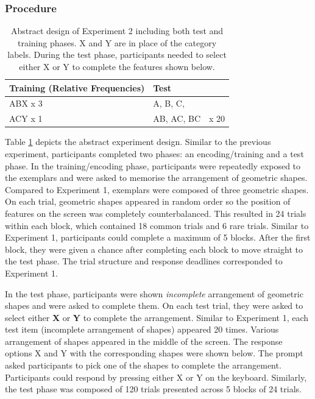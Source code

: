 \documentclass[10pt,letterpaper]{article}
\begin{document}
\subsubsection{Procedure}

\begin{table}[!ht]
  \begin{center}
    \caption{Abstract design of Experiment 2 including both test and training phases. X and Y are in place of the category labels. During the test phase, participants needed to select either X or Y to complete the features shown below.\\}
    \label{tab:abstract-exp2}
    \begin{tabular}{llr} %
      \textbf{Training (Relative Frequencies)} & \textbf{Test}& \\
      \hline
      ABX x 3 &  A, B, C,        & \\
      ACY x 1 &  AB, AC, BC      & x 20 \\
      \hline
    \end{tabular}
  \end{center}
\end{table}

Table \ref*{tab:abstract-exp2} depicts the abstract experiment design.
Similar to the previous experiment, participants completed two phases: an encoding/training and a test phase.
In the training/encoding phase, participants were repeatedly exposed to the exemplars and were asked to memorise the arrangement of geometric shapes.
Compared to Experiment 1, exemplars were composed of three geometric shapes.
On each trial, geometric shapes appeared in random order so the position of features on the screen was completely counterbalanced.
This resulted in 24 trials within each block, which contained 18 common trials and 6 rare trials.
Similar to Experiment 1, participants could complete a maximum of 5 blocks.
After the first block, they were given a chance after completing each block to move straight to the test phase.
The trial structure and response deadlines corresponded to Experiment 1.

In the test phase, participants were shown \textit{incomplete} arrangement of geometric shapes and were asked to complete them.
On each test trial, they were asked to select either \textbf{X} or \textbf{Y} to complete the arrangement.
Similar to Experiment 1, each test item (incomplete arrangement of shapes) appeared 20 times.
Various arrangement of shapes appeared in the middle of the screen.
The response options X and Y with the corresponding shapes were shown below.
The prompt asked participants to pick one of the shapes to complete the arrangement.
Participants could respond by pressing either X or Y on the keyboard.
Similarly, the test phase was composed of 120 trials presented across 5 blocks of 24 trials.
\\
\end{document}
